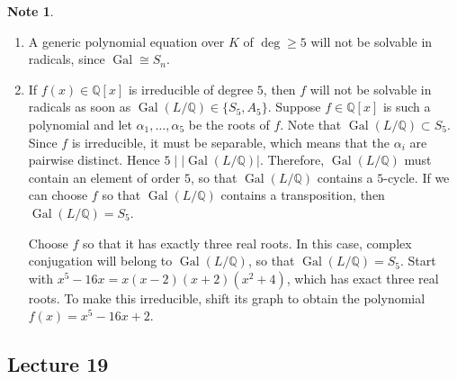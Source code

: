 \documentclass[10pt,letterpaper,cm]{nupset}
\theoremstyle{definition}
\newtheorem{note}[definition]{Note}
\theoremstyle{theorem}
\theoremstyle{remark}
\newcommand{\Q}{\mathbb Q}
\newcommand{\1}{\mathbf{1}}
\newcommand{\0}{\vec 0}
\DeclareMathOperator{\gal}{Gal}
\begin{document}
\begin{note} $ $
\begin{enumerate}
\item A generic polynomial equation over $K$ of $\deg \geq 5$ will not be solvable in radicals, since $\gal \cong S_n$.
\item If $f(x) \in \Q[x]$ is irreducible of degree $5$, then $f$ will not be solvable in radicals as soon as $\gal(L/\Q) \in \{S_5, A_5\}$. Suppose $f \in \Q[x]$ is such a polynomial and let $\alpha_1, \ldots, \alpha_5$ be the roots of $f$. Note that $\gal(L/\Q) \subset S_5$. Since  $f$ is irreducible, it must be separable, which means that the $\alpha_i$ are pairwise distinct. Hence $5 \mid \left\lvert{\gal(L/\Q)}\right\rvert$. Therefore, $\gal(L/\Q)$ must contain an element of order $5$, so that $\gal(L/\Q)$ contains a $5$-cycle. If we can choose $f$ so that $\gal(L/\Q)$ contains a transposition, then $\gal(L/\Q) = S_5$.  

Choose $f$ so that it has exactly three real roots. In this case, complex conjugation will belong to $\gal(L/\Q)$, so that $\gal(L/\Q) = S_5$. Start with $x^5-16x = x(x-2)(x+2)(x^2 +4)$, which has exact three real roots. To make this irreducible, shift its graph to obtain the polynomial $f(x) = x^5 -16x +2$.
\end{enumerate}
\end{note}

\subsection{Lecture 19}\label{19}
\end{document}
